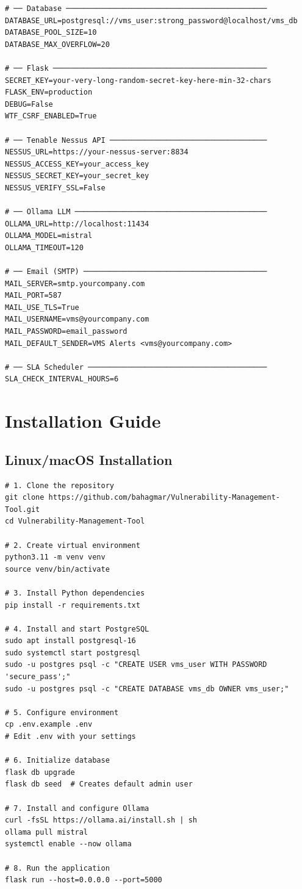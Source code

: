 \begin{lstlisting}[style=bash, caption={.env Configuration Template}, label={lst:env}]
# ── Database ──────────────────────────────────────────────
DATABASE_URL=postgresql://vms_user:strong_password@localhost/vms_db
DATABASE_POOL_SIZE=10
DATABASE_MAX_OVERFLOW=20

# ── Flask ─────────────────────────────────────────────────
SECRET_KEY=your-very-long-random-secret-key-here-min-32-chars
FLASK_ENV=production
DEBUG=False
WTF_CSRF_ENABLED=True

# ── Tenable Nessus API ────────────────────────────────────
NESSUS_URL=https://your-nessus-server:8834
NESSUS_ACCESS_KEY=your_access_key
NESSUS_SECRET_KEY=your_secret_key
NESSUS_VERIFY_SSL=False

# ── Ollama LLM ────────────────────────────────────────────
OLLAMA_URL=http://localhost:11434
OLLAMA_MODEL=mistral
OLLAMA_TIMEOUT=120

# ── Email (SMTP) ──────────────────────────────────────────
MAIL_SERVER=smtp.yourcompany.com
MAIL_PORT=587
MAIL_USE_TLS=True
MAIL_USERNAME=vms@yourcompany.com
MAIL_PASSWORD=email_password
MAIL_DEFAULT_SENDER=VMS Alerts <vms@yourcompany.com>

# ── SLA Scheduler ─────────────────────────────────────────
SLA_CHECK_INTERVAL_HOURS=6
\end{lstlisting}

\chapter{Installation Guide}
\label{app:install}

\section*{Linux/macOS Installation}

\begin{lstlisting}[style=bash, caption={VMS Installation Steps}, label={lst:install}]
# 1. Clone the repository
git clone https://github.com/bahagmar/Vulnerability-Management-Tool.git
cd Vulnerability-Management-Tool

# 2. Create virtual environment
python3.11 -m venv venv
source venv/bin/activate

# 3. Install Python dependencies
pip install -r requirements.txt

# 4. Install and start PostgreSQL
sudo apt install postgresql-16
sudo systemctl start postgresql
sudo -u postgres psql -c "CREATE USER vms_user WITH PASSWORD 'secure_pass';"
sudo -u postgres psql -c "CREATE DATABASE vms_db OWNER vms_user;"

# 5. Configure environment
cp .env.example .env
# Edit .env with your settings

# 6. Initialize database
flask db upgrade
flask db seed  # Creates default admin user

# 7. Install and configure Ollama
curl -fsSL https://ollama.ai/install.sh | sh
ollama pull mistral
systemctl enable --now ollama

# 8. Run the application
flask run --host=0.0.0.0 --port=5000
\end{lstlisting}

